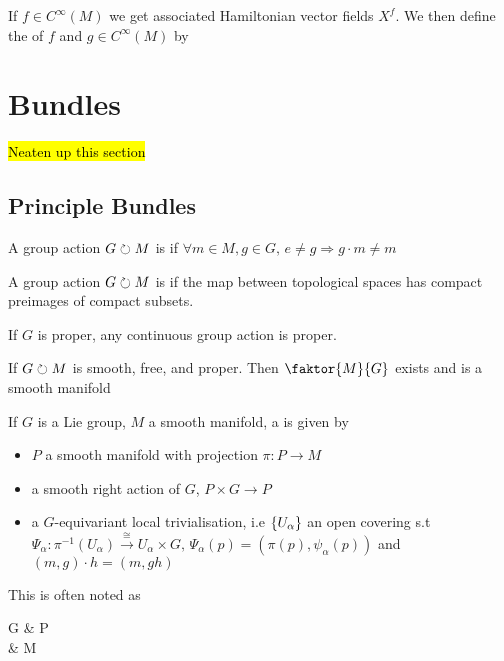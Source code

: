 \documentclass{article}
\begin{document}
\begin{aside}
If $f \in C^\infty(M)$ we get associated Hamiltonian vector fields $X^f$. We then define the  of $f$ and $g \in C^\infty(M)$ by 
\end{aside}
\section{Bundles}
\hl{Neaten up this section}
\subsection{Principle Bundles}
\begin{definition}
A group action $G \circlearrowright M$ is  if $\forall m \in M, g \in G, \, e \neq g \Rightarrow g\cdot m \neq m$
\end{definition}

\begin{definition}
A group action $G \circlearrowright M$ is  if the map between topological spaces 
has compact preimages of compact subsets. 
\end{definition}

\begin{prop}
If $G$ is proper, any continuous group action is proper. 
\end{prop}

\begin{lemma}
If $G \circlearrowright M$ is smooth, free, and proper. Then $\faktor{M}{G}$ exists and is a smooth manifold
\end{lemma}

\begin{definition}
If $G$ is a Lie group, $M$ a smooth manifold, a  is given by 
\begin{itemize}
    \item $P$ a smooth manifold with projection $\pi:P \to M$
    \item a smooth right action of $G$, $P \times G \to P$
    \item a $G$-equivariant local trivialisation, i.e $\left\{ U_\alpha \right\}$ an open covering s.t $\Psi_\alpha : \pi^{-1}(U_\alpha) \overset{\cong}{\to} U_\alpha \times G, \, \Psi_\alpha(p) = (\pi(p),\psi_\alpha(p))$ and $(m,g) \cdot h = (m,gh)$
\end{itemize}
This is often noted as 
\begin{tkz}
G \arrow[r] & P \arrow[d,"\pi"] \\ & M
\end{tkz}
\end{definition}
\end{document}
